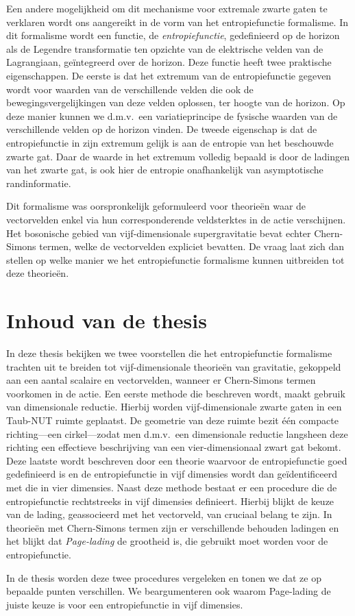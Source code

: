 \documentclass[12pt,twoside]{book}
\begin{document}
\begin{appendices}
Een andere mogelijkheid om dit mechanisme voor extremale zwarte gaten te verklaren wordt ons aangereikt in de vorm van het entropiefunctie formalisme. In dit formalisme wordt een functie, de \emph{entropiefunctie}, gedefinieerd op de horizon als de Legendre transformatie ten opzichte van de elektrische velden van de Lagrangiaan, ge\"integreerd over de horizon. Deze functie heeft twee praktische eigenschappen. De eerste is dat het extremum van de entropiefunctie gegeven wordt voor waarden van de verschillende velden die ook de bewegingsvergelijkingen van deze velden oplossen, ter hoogte van de horizon. Op deze manier kunnen we d.m.v.\ een variatieprincipe de fysische waarden van de verschillende velden op de horizon vinden. De tweede eigenschap is dat de entropiefunctie in zijn extremum gelijk is aan de entropie van het beschouwde zwarte gat. Daar de waarde in het extremum volledig bepaald is door de ladingen van het zwarte gat, is ook hier de entropie onafhankelijk van asymptotische randinformatie.

Dit formalisme was oorspronkelijk geformuleerd voor theorie\"en waar de vectorvelden enkel via hun corresponderende veldsterktes in de actie verschijnen. Het bosonische gebied van vijf-dimensionale supergravitatie bevat echter Chern-Simons termen, welke de vectorvelden expliciet bevatten. De vraag laat zich dan stellen op welke manier we het entropiefunctie formalisme kunnen uitbreiden tot deze theorie\"en.

\section{Inhoud van de thesis}

In deze thesis bekijken we twee voorstellen die het entropiefunctie formalisme trachten uit te breiden tot vijf-dimensionale theorie\"en van gravitatie, gekoppeld aan een aantal scalaire en vectorvelden, wanneer er Chern-Simons termen voorkomen in de actie. Een eerste methode die beschreven wordt, maakt gebruik van dimensionale reductie. Hierbij worden vijf-dimensionale zwarte gaten in een Taub-NUT ruimte geplaatst. De geometrie van deze ruimte bezit \'e\'en compacte richting---een cirkel---zodat men d.m.v.\ een dimensionale reductie langsheen deze richting een effectieve beschrijving van een vier-dimensionaal zwart gat bekomt. Deze laatste wordt beschreven door een theorie waarvoor de entropiefunctie goed gedefinieerd is en de entropiefunctie in vijf dimensies wordt dan ge\"identificeerd met die in vier dimensies.
Naast deze methode bestaat er een procedure die de entropiefunctie rechtstreeks in vijf dimensies definieert. Hierbij blijkt de keuze van de lading, geassocieerd met het vectorveld, van cruciaal belang te zijn. In theorie\"en met Chern-Simons termen zijn er verschillende behouden ladingen en het blijkt dat \emph{Page-lading} de grootheid is, die gebruikt moet worden voor de entropiefunctie.

In de thesis worden deze twee procedures vergeleken en tonen we dat ze op bepaalde punten verschillen. We beargumenteren ook waarom Page-lading de juiste keuze is voor een entropiefunctie in vijf dimensies.



\end{appendices}
\end{document}
